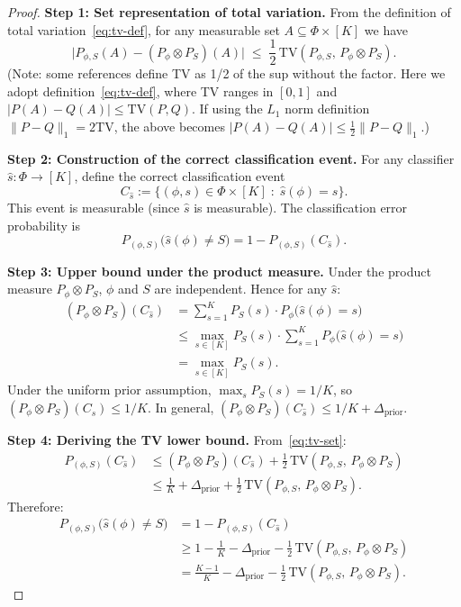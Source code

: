 \documentclass[12pt,a4paper]{article}
\newcommand{\TV}{\mathrm{TV}}
\begin{document}
\begin{proof}
\textbf{Step 1: Set representation of total variation.}
From the definition of total variation~\eqref{eq:tv-def}, for any measurable set $A \subseteq \Phi \times [K]$ we have
\begin{equation}\label{eq:tv-set}
    \bigl| P_{\phi,S}(A) - (P_\phi \otimes P_S)(A) \bigr|
    \;\leq\; \frac{1}{2}\,\TV(P_{\phi,S},\, P_\phi \otimes P_S).
\end{equation}
(Note: some references define TV as 1/2 of the sup without the factor. Here we adopt definition~\eqref{eq:tv-def}, where TV ranges in $[0,1]$ and $|P(A)-Q(A)| \leq \TV(P,Q)$. If using the $L_1$ norm definition $\|P-Q\|_1 = 2\TV$, the above becomes $|P(A)-Q(A)| \leq \frac12 \|P-Q\|_1$.)

\textbf{Step 2: Construction of the correct classification event.}
For any classifier $\hat{s}: \Phi \to [K]$, define the correct classification event
\[
C_{\hat{s}} := \bigl\{ (\phi, s) \in \Phi \times [K] \;:\; \hat{s}(\phi) = s \bigr\}.
\]
This event is measurable (since $\hat{s}$ is measurable). The classification error probability is
\[
P_{(\phi,S)}\bigl(\hat{s}(\phi) \neq S\bigr) = 1 - P_{(\phi,S)}(C_{\hat{s}}).
\]

\textbf{Step 3: Upper bound under the product measure.}
Under the product measure $P_\phi \otimes P_S$, $\phi$ and $S$ are independent. Hence for any $\hat{s}$:
\begin{align*}
    (P_\phi \otimes P_S)(C_{\hat{s}})
    &= \sum_{s=1}^K P_S(s) \cdot P_\phi\bigl(\hat{s}(\phi) = s\bigr) \\
    &\leq \max_{s\in[K]} P_S(s) \cdot \sum_{s=1}^K P_\phi\bigl(\hat{s}(\phi) = s\bigr) \\
    &= \max_{s\in[K]} P_S(s).
\end{align*}
Under the uniform prior assumption, $\max_s P_S(s) = 1/K$, so $(P_\phi \otimes P_S)(C_{\hat{s}}) \leq 1/K$.
In general, $(P_\phi \otimes P_S)(C_{\hat{s}}) \leq 1/K + \Delta_{\mathrm{prior}}$.

\textbf{Step 4: Deriving the TV lower bound.}
From~\eqref{eq:tv-set}:
\begin{align*}
    P_{(\phi,S)}(C_{\hat{s}})
    &\leq (P_\phi \otimes P_S)(C_{\hat{s}}) + \frac12\,\TV(P_{\phi,S},\, P_\phi \otimes P_S) \\
    &\leq \frac{1}{K} + \Delta_{\mathrm{prior}} + \frac12\,\TV(P_{\phi,S},\, P_\phi \otimes P_S).
\end{align*}
Therefore:
\begin{align*}
    P_{(\phi,S)}\bigl(\hat{s}(\phi) \neq S\bigr)
    &= 1 - P_{(\phi,S)}(C_{\hat{s}}) \\
    &\geq 1 - \frac{1}{K} - \Delta_{\mathrm{prior}}
            - \frac12\,\TV(P_{\phi,S},\, P_\phi \otimes P_S) \\
    &= \frac{K-1}{K} - \Delta_{\mathrm{prior}}
       - \frac12\,\TV(P_{\phi,S},\, P_\phi \otimes P_S).
\end{align*}


\end{proof}
\end{document}
